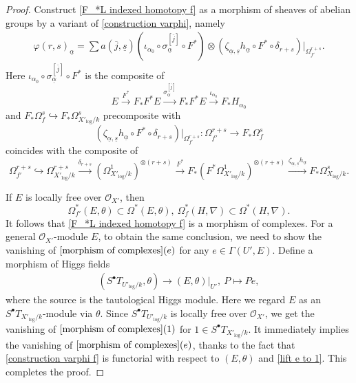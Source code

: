 \documentclass[12pt, a4paper]{article}
\begin{document}
\begin{proof}
Construct \eqref{F_*L indexed homotopy f} as a morphism of sheaves of abelian groups by a variant of \eqref{construction varphi}, namely
\begin{eqnarray}\label{construction varphi f}
\varphi(r,s)_{\underline\alpha}=\sum a(\overline j,\underline s)(\iota_{\alpha_0}\circ\sigma_{\underline\alpha}^{[\overline j]}\circ F^*)\otimes(\zeta_{\underline\alpha,\underline s}h_{\underline\alpha}\circ F^*\circ\delta_{r+s})|_{\Omega_{f'}^{r+s}}.
\end{eqnarray}
Here $\iota_{\alpha_0}\circ\sigma_{\underline\alpha}^{[\overline j]}\circ F^*$ is the composite of 
$$
E\stackrel{F^*}{\longrightarrow}F_*F^*E\stackrel{\sigma_{\underline\alpha}^{[\overline j]}}{\longrightarrow}F_*F^*E\stackrel{\iota_{\alpha_0}}{\longrightarrow}F_*H_{\alpha_0}
$$
and $F_*\Omega^s_f\hookrightarrow F_*\Omega^s_{X'_{\log}/k}$ precomposite with
$$(\zeta_{\underline\alpha,\underline s}h_{\underline\alpha}\circ F^*\circ\delta_{r+s})|_{\Omega_{f'}^{r+s}}:\Omega^{r+s}_{f'}\to F_*\Omega^s_f$$
coincides with the composite of
$$
\Omega^{r+s}_{f'}\hookrightarrow\Omega^{r+s}_{X'_{\log}/k}\stackrel{\delta_{r+s}}{\longrightarrow}(\Omega^1_{X'_{\log}/k})^{\otimes(r+s)}\stackrel{F^*}{\longrightarrow}F_*(F^*\Omega^1_{X'_{\log}/k})^{\otimes(r+s)}\stackrel{\zeta_{\underline\alpha,\underline s}h_{\underline\alpha}}{\longrightarrow}F_*\Omega_{X_{\log}/k}^s.
$$

If $E$ is locally free over $\mathcal O_{X'}$, then
$$
\Omega_{f'}^*(E,\theta)\subset\Omega^*(E,\theta),~\Omega_f^*(H,\nabla)\subset\Omega^*(H,\nabla).
$$
It follows that \eqref{F_*L indexed homotopy f} is a morphism of complexes. For a general $\mathcal O_{X'}$-module $E$, to obtain the same conclusion, we need to show the vanishing of $\eqref{morphism of complexes}(e)$ for any $e\in\Gamma(U',E)$. Define a morphism of Higgs fields
\begin{eqnarray}\label{lift e to 1}
(S^\bullet T_{U'_{\log}/k},\theta)\to(E,\theta)|_{U'},~P\mapsto Pe,
\end{eqnarray}
where the source is the tautological Higgs module. Here we regard $E$ as an $S^\bullet T_{X'_{\log}/k}$-module via $\theta$. Since $S^\bullet T_{U'_{\log}/k}$ is locally free over $\mathcal O_{X'}$, we get the vanishing of $\eqref{morphism of complexes}(1)$ for $1\in S^\bullet T_{X'_{\log}/k}$. It immediately implies the vanishing of $\eqref{morphism of complexes}(e)$, thanks to the fact that \eqref{construction varphi f} is functorial with respect to $(E,\theta)$ and \eqref{lift e to 1}. This completes the proof.
\end{proof}
\end{document}
